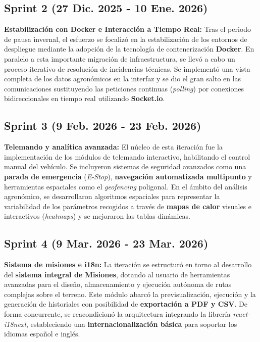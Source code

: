 \subsection{Sprint 2 (27 Dic. 2025 - 10 Ene. 2026)}
\textbf{Estabilización con Docker e Interacción a Tiempo Real:} Tras el periodo de pausa invernal, el esfuerzo se focalizó en la estabilización de los entornos de despliegue mediante la adopción de la tecnología de contenerización \textbf{Docker}. En paralelo a esta importante migración de infraestructura, se llevó a cabo un proceso iterativo de resolución de incidencias técnicas. Se implementó una vista completa de los datos agronómicos en la interfaz y se dio el gran salto en las comunicaciones sustituyendo las peticiones continuas (\textit{polling}) por conexiones bidireccionales en tiempo real utilizando \textbf{Socket.io}.

\subsection{Sprint 3 (9 Feb. 2026 - 23 Feb. 2026)}
\textbf{Telemando y analítica avanzada:} El núcleo de esta iteración fue la implementación de los módulos de telemando interactivo, habilitando el control manual del vehículo. Se incluyeron sistemas de seguridad avanzados como una \textbf{parada de emergencia} (\textit{E-Stop}), \textbf{navegación automatizada multipunto} y herramientas espaciales como el \textit{geofencing} poligonal. En el ámbito del análisis agronómico, se desarrollaron algoritmos espaciales para representar la variabilidad de los parámetros recogidos a través de \textbf{mapas de calor} visuales e interactivos (\textit{heatmaps}) y se mejoraron las tablas dinámicas.

\subsection{Sprint 4 (9 Mar. 2026 - 23 Mar. 2026)}
\textbf{Sistema de misiones e i18n:} La iteración se estructuró en torno al desarrollo del \textbf{sistema integral de Misiones}, dotando al usuario de herramientas avanzadas para el diseño, almacenamiento y ejecución autónoma de rutas complejas sobre el terreno. Este módulo abarcó la previsualización, ejecución y la generación de historiales con posibilidad de \textbf{exportación a PDF y CSV}. De forma concurrente, se reacondicionó la arquitectura integrando la librería \textit{react-i18next}, estableciendo una \textbf{internacionalización básica} para soportar los idiomas español e inglés.

